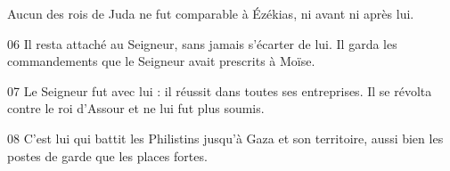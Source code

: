 Aucun des rois de Juda ne fut comparable à Ézékias, ni avant ni après lui.


06 Il resta attaché au Seigneur, sans jamais s’écarter de lui. Il garda les commandements que le Seigneur avait prescrits à Moïse.

07 Le Seigneur fut avec lui : il réussit dans toutes ses entreprises. Il se révolta contre le roi d’Assour et ne lui fut plus soumis.

08 C’est lui qui battit les Philistins jusqu’à Gaza et son territoire, aussi bien les postes de garde que les places fortes.
